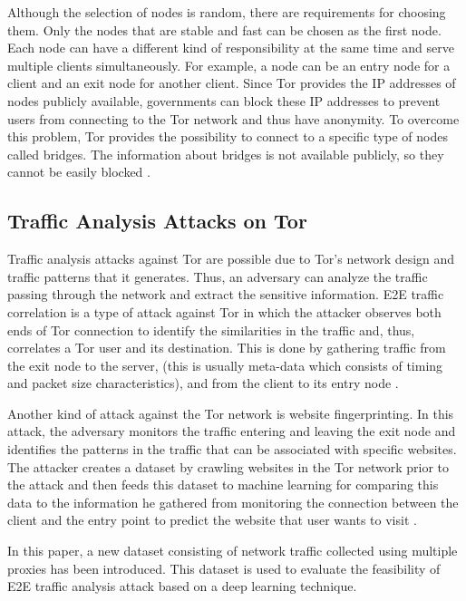 \documentclass[sigconf]{acmart}
\begin{document}
Although the selection of nodes is random, there are requirements for choosing them. Only the nodes that are stable and fast can be chosen as the first node. Each node can have a different kind of responsibility at the same time and serve multiple clients simultaneously. For example, a node can be an entry node for a client and an exit node for another client. Since Tor provides the IP addresses of nodes publicly available, governments can block these IP addresses to prevent users from connecting to the Tor network and thus have anonymity. To overcome this problem, Tor provides the possibility to connect to a specific type of nodes called bridges. The information about bridges is not available publicly, so they cannot be easily blocked \cite{Torprojectrelays}. 


\subsection{Traffic Analysis Attacks on Tor} \label{2.2}

Traffic analysis attacks against Tor are possible due to Tor's network design and traffic patterns that it generates. Thus, an adversary can analyze the traffic passing through the network and extract the sensitive information. E2E traffic correlation is a type of attack against Tor in which the attacker observes both ends of Tor connection to identify the similarities in the traffic and, thus, correlates a Tor user and its destination. This is done by gathering traffic from the exit node to the server, (this is usually meta-data which consists of timing and packet size characteristics), and from the client to its entry node \cite{defendingtorcorrelation}.

Another kind of attack against the Tor network is website fingerprinting. In this attack, the adversary monitors the traffic entering and leaving the exit node and identifies the patterns in the traffic that can be associated with specific websites. The attacker creates a dataset by crawling websites in the Tor network prior to the attack and then feeds this dataset to machine learning for comparing this data to the information he gathered from monitoring the connection between the client and the entry point to predict the website that user wants to visit \cite{277132}.

In this paper, a new dataset consisting of network traffic collected using multiple proxies has been introduced. This dataset is used to evaluate the feasibility of E2E traffic analysis attack based on a deep learning technique.
\end{document}
